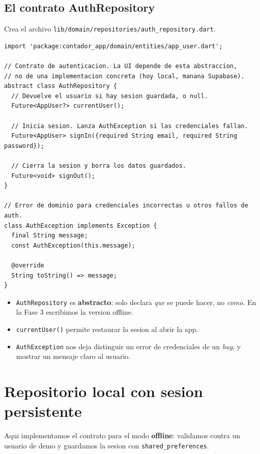 \documentclass[11pt,a4paper,oneside]{book}
\newcommand{\file}[1]{\texttt{\textcolor{brandDark}{#1}}}
\begin{document}
\section{El contrato AuthRepository}
\begin{wherebox}
Crea el archivo \file{lib/domain/repositories/auth\_repository.dart}.
\end{wherebox}

\begin{lstlisting}
import 'package:contador_app/domain/entities/app_user.dart';

// Contrato de autenticacion. La UI depende de esta abstraccion,
// no de una implementacion concreta (hoy local, manana Supabase).
abstract class AuthRepository {
  // Devuelve el usuario si hay sesion guardada, o null.
  Future<AppUser?> currentUser();

  // Inicia sesion. Lanza AuthException si las credenciales fallan.
  Future<AppUser> signIn({required String email, required String password});

  // Cierra la sesion y borra los datos guardados.
  Future<void> signOut();
}

// Error de dominio para credenciales incorrectas u otros fallos de auth.
class AuthException implements Exception {
  final String message;
  const AuthException(this.message);

  @override
  String toString() => message;
}
\end{lstlisting}

\begin{whatbox}
\begin{itemize}
  \item \texttt{AuthRepository} es \textbf{abstracto}: solo declara \emph{que} se puede
        hacer, no \emph{como}. En la Fase 3 escribimos la version offline.
  \item \texttt{currentUser()} permite restaurar la sesion al abrir la app.
  \item \texttt{AuthException} nos deja distinguir un error de credenciales de un
        \emph{bug}, y mostrar un mensaje claro al usuario.
\end{itemize}
\end{whatbox}

\chapter{Repositorio local con sesion persistente}
Aqui implementamos el contrato para el modo \textbf{offline}: validamos contra un
usuario de demo y guardamos la sesion con \texttt{shared\_preferences}.
\end{document}
